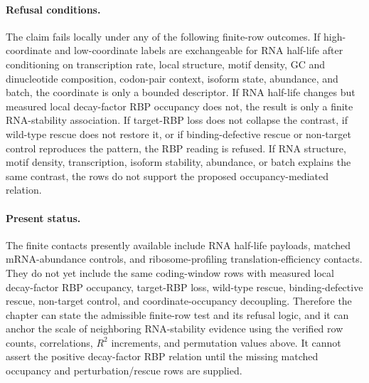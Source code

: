 \paragraph{Refusal conditions.}
The claim fails locally under any of the following finite-row outcomes.  If high-coordinate and low-coordinate labels are exchangeable for RNA half-life after conditioning on transcription rate, local structure, motif density, GC and dinucleotide composition, codon-pair context, isoform state, abundance, and batch, the coordinate is only a bounded descriptor.  If RNA half-life changes but measured local decay-factor RBP occupancy does not, the result is only a finite RNA-stability association.  If target-RBP loss does not collapse the contrast, if wild-type rescue does not restore it, or if binding-defective rescue or non-target control reproduces the pattern, the RBP reading is refused.  If RNA structure, motif density, transcription, isoform stability, abundance, or batch explains the same contrast, the rows do not support the proposed occupancy-mediated relation.

\paragraph{Present status.}
The finite contacts presently available include RNA half-life payloads, matched mRNA-abundance controls, and ribosome-profiling translation-efficiency contacts.  They do not yet include the same coding-window rows with measured local decay-factor RBP occupancy, target-RBP loss, wild-type rescue, binding-defective rescue, non-target control, and coordinate-occupancy decoupling.  Therefore the chapter can state the admissible finite-row test and its refusal logic, and it can anchor the scale of neighboring RNA-stability evidence using the verified row counts, correlations, $R^2$ increments, and permutation values above.  It cannot assert the positive decay-factor RBP relation until the missing matched occupancy and perturbation/rescue rows are supplied.
